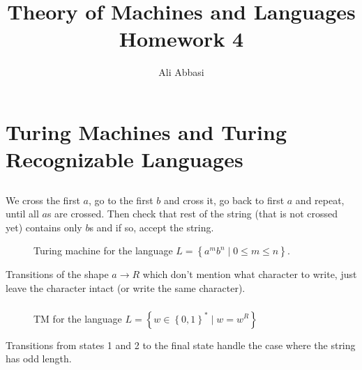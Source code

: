 \documentclass{article}
\title{Theory of Machines and Languages Homework 4}
\author{Ali Abbasi}
\begin{document}
\maketitle
\tableofcontents
\pagebreak

\section{Turing Machines and Turing Recognizable Languages}
\subsection{}
We cross the first \(a\), go to the first \(b\) and cross it, go back to first \(a\) and repeat, until all \(a\)s are crossed.
Then check that rest of the string (that is not crossed yet) contains only \(b\)s and if so, accept the string.
\begin{figure}[H]
\centering

\caption{Turing machine for the language \(L= \left\{a^mb^n\mid 0\le m\le n\right\}\).}
\end{figure}
Transitions of the shape \(a\to R\) which don't mention what character to write, just leave the character intact (or write the same character).

\subsubsection{}
\begin{figure}[H]
\centering

\caption{TM for the language \(L=\left\{w\in \left\{0, 1\right\}^*\mid w=w^R\right\}\)}
\end{figure}
Transitions from states 1 and 2 to the final state handle the case where the string has odd length.
\subsection{}
\end{document}
